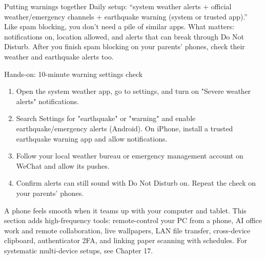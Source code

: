 \begin{tcbinfo}{Putting warnings together}
Daily setup: “system weather alerts + official weather/emergency channels + earthquake warning (system or trusted app).” Like spam blocking, you don't need a pile of similar apps. What matters: notifications on, location allowed, and alerts that can break through Do Not Disturb. After you finish spam blocking on your parents' phones, check their weather and earthquake alerts too.

\end{tcbinfo}

\begin{tcbpractice}{Hands-on: 10-minute warning settings check}
\begin{enumerate}
  \item Open the system weather app, go to settings, and turn on "Severe weather alerts" notifications.
  \item Search Settings for "earthquake" or "warning" and enable earthquake/emergency alerts (Android). On iPhone, install a trusted earthquake warning app and allow notifications.
  \item Follow your local weather bureau or emergency management account on WeChat and allow its pushes.
  \item Confirm alerts can still sound with Do Not Disturb on. Repeat the check on your parents' phones.
\end{enumerate}

\end{tcbpractice}


A phone feels smooth when it teams up with your computer and tablet. This section adds high-frequency tools: remote-control your PC from a phone, AI office work and remote collaboration, live wallpapers, LAN file transfer, cross-device clipboard, authenticator 2FA, and linking paper scanning with schedules. For systematic multi-device setups, see Chapter 17.


